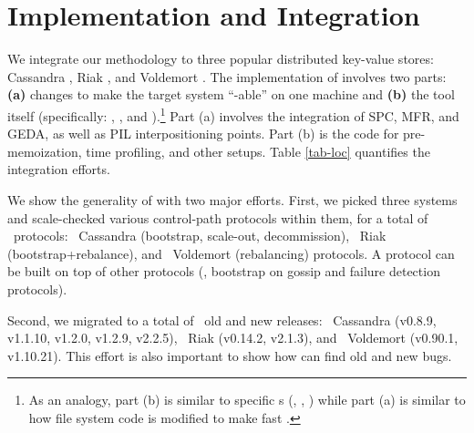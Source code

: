 

\section{Implementation and Integration}
\label{sec-impl}









We integrate our \sck methodology to three popular distributed key-value
stores: Cassandra \cite{Lakshman+09-Cassandra}, Riak \cite{RiakWeb}, and
Voldemort \cite{VoldemortWeb}.
%
The implementation of \sck involves two parts:
%
{\bf (a)} changes to make the target system ``\sck-able'' on one machine and
%
{\bf (b)} the  tool itself (specifically: \scass, \svold, and
\sriak).\footnote{As an analogy, part (b) is similar to specific s
  (\eg, , ) while part (a) is
  similar to how file system code is modified to make 
  fast \cite{Henson+06-Chunkfs, Ma+13-Ffsck}.}
Part (a) involves
the integration of SPC, MFR, and GEDA, as well as PIL interpositioning
points.  Part (b) is the code for pre-memoization, time profiling, and
other  setups.
%
Table \ref{tab-loc} quantifies the integration efforts.  
%

 We show the generality of \sck with two major efforts.
First, we picked three systems and scale-checked various control-path
protocols within them, for a total of \numProt\ protocols:
%
\numProtCass\ Cassandra (bootstrap, scale-out, decommission),
%
\numProtRiak\ Riak (bootstrap+rebalance), and 
%
\numProtVold\ Voldemort (rebalancing) protocols.
%
A protocol can be built on top of other protocols (\eg, bootstrap on
gossip and failure detection protocols).


Second, we migrated \sck to a total of \numVers\ old and new releases:
%
\numVersCass\ Cassandra (v0.8.9, v1.1.10, v1.2.0, v1.2.9, v2.2.5),
%
\numVersRiak\ Riak (v0.14.2, v2.1.3), and
%
\numVersVold\ Voldemort (v0.90.1, v1.10.21).
%
This effort is also important to show how \sck can find old and new
bugs. 



